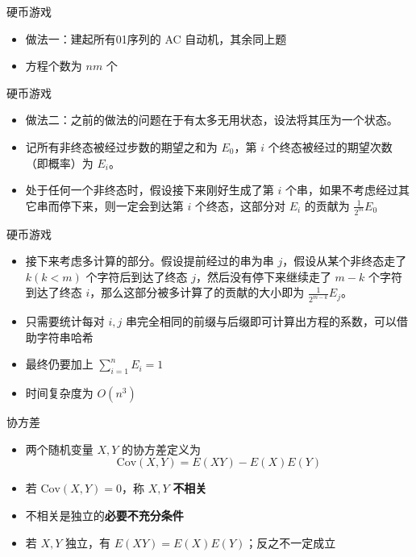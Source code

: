 \documentclass{beamer}
\newcommand{\cov}{\text{Cov}}
\begin{document}
    \begin{frame}{硬币游戏}
        \begin{itemize}
            \setlength{\itemsep}{10pt}
            \item 做法一：建起所有01序列的 AC 自动机，其余同上题
            \item 方程个数为 $nm$ 个
        \end{itemize}
    \end{frame}

    \begin{frame}{硬币游戏}
        \begin{itemize}
            \setlength{\itemsep}{10pt}
            \item 做法二：之前的做法的问题在于有太多无用状态，设法将其压为一个状态。
            \item 记所有非终态被经过步数的期望之和为 $E_0$，第 $i$ 个终态被经过的期望次数（即概率）为 $E_i$。
            \item 处于任何一个非终态时，假设接下来刚好生成了第 $i$ 个串，如果不考虑经过其它串而停下来，则一定会到达第 $i$ 个终态，这部分对 $E_i$ 的贡献为 $\frac{1}{2^m}E_0$
        \end{itemize}
    \end{frame}

    \begin{frame}{硬币游戏}
        \begin{itemize}
            \setlength{\itemsep}{10pt}
            \item 接下来考虑多计算的部分。假设提前经过的串为串 $j$，假设从某个非终态走了 $k(k<m)$ 个字符后到达了终态 $j$，然后没有停下来继续走了 $m-k$ 个字符到达了终态 $i$，那么这部分被多计算了的贡献的大小即为 $\frac{1}{2^{m-k}}E_j$。
            \item 只需要统计每对 $i,j$ 串完全相同的前缀与后缀即可计算出方程的系数，可以借助字符串哈希
            \item 最终仍要加上 $\sum_{i=1}^{n}E_i=1$
            \item 时间复杂度为 $O(n^3)$
        \end{itemize}
    \end{frame}

    \begin{frame}{协方差}
        \begin{itemize}
            \setlength{\itemsep}{10pt}
            \item 两个随机变量 $X,Y$ 的协方差定义为 
            $$
                \cov(X,Y) = E(XY) - E(X)E(Y)
            $$
            \item 若 $\cov(X,Y)=0$，称 $X,Y$ \textbf{不相关}
            \item 不相关是独立的\textbf{必要不充分条件}
            \item 若 $X,Y$ 独立，有 $E(XY)=E(X)E(Y)$；反之不一定成立
        \end{itemize}
    \end{frame}
\end{document}
